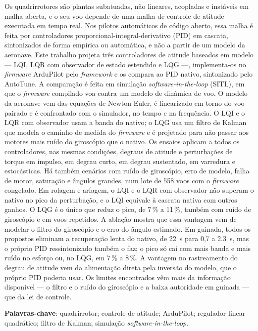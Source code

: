 \setlength{\absparsep}{18pt}
\begin{resumo}
Os quadrirrotores são plantas subatuadas, não lineares, acopladas e
instáveis em malha aberta, e o seu voo depende de uma malha de controle de
atitude executada em tempo real. Nos pilotos automáticos de código aberto,
essa malha é feita por controladores proporcional-integral-derivativo (PID)
em cascata, sintonizados de forma empírica ou automática, e não a partir de
um modelo da aeronave. Este trabalho projeta três controladores de atitude
baseados em modelo --- LQI, LQR com observador de estado estendido e LQG
---, implementa-os no \textit{firmware} ArduPilot pelo \textit{framework}
 e os compara ao PID nativo, sintonizado pelo
AutoTune. A comparação é feita em simulação \textit{software-in-the-loop}
(SITL), em que o \textit{firmware} compilado voa contra um modelo de dinâmica
de voo. O modelo da aeronave vem das equações de Newton-Euler, é linearizado
em torno do voo pairado e é confrontado com o simulador, no tempo e na
frequência. O LQI e o LQR com observador usam a banda do nativo; o LQG usa um
filtro de Kalman que modela o caminho de medida do \textit{firmware} e é
projetado para não passar aos motores mais ruído do giroscópio que o nativo.
Os ensaios aplicam a todos os controladores, nas mesmas condições, degraus
de atitude e perturbações de torque em impulso, em degrau curto, em degrau
sustentado, em varredura e estocásticas. Há também cenários com ruído de
giroscópio, erro de modelo, falha de motor, saturação e ângulos grandes,
num lote de 558 voos com o \textit{firmware} congelado. Em rolagem e
arfagem, o LQI e o LQR com observador não superam o nativo no pico da
perturbação, e o LQI equivale à cascata nativa com outros ganhos. O LQG é o
único que reduz o pico, de 7\,\% a 11\,\%, também com ruído de giroscópio e
em voos repetidos. A ablação mostra que essa vantagem vem de modelar o
filtro do giroscópio e o erro do ângulo estimado. Em guinada, todos os
propostos eliminam a recuperação lenta do nativo, de \SI{22}{\second} para
0,7 a \SI{2.3}{\second}, mas o próprio PID ressintonizado também o faz; o
pico só cai com mais banda e mais ruído no esforço ou, no LQG, em 7\,\% a
8\,\%. A vantagem no rastreamento do degrau de atitude vem da alimentação
direta pela inversão do modelo, que o próprio PID poderia usar. Os limites
encontrados vêm mais da informação disponível --- o filtro e o ruído do
giroscópio e a baixa autoridade em guinada --- que da lei de controle.

\textbf{Palavras-chave}: quadrirrotor; controle de atitude; ArduPilot;
regulador linear quadrático; filtro de Kalman; simulação
\textit{software-in-the-loop}.
\end{resumo}
